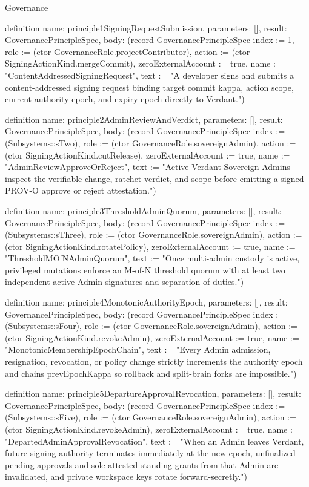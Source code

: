 \begin{lexlean}{Governance}
\begin{semanticmodule}
definition{
  name: principle1SigningRequestSubmission,
  parameters: [],
  result: GovernancePrincipleSpec,
  body: (record GovernancePrincipleSpec {index := 1, role := (ctor GovernanceRole.projectContributor), action := (ctor SigningActionKind.mergeCommit), zeroExternalAccount := true, name := "ContentAddressedSigningRequest", text := "A developer signs and submits a content-addressed signing request binding target commit kappa, action scope, current authority epoch, and expiry epoch directly to Verdant."})
}

definition{
  name: principle2AdminReviewAndVerdict,
  parameters: [],
  result: GovernancePrincipleSpec,
  body: (record GovernancePrincipleSpec {index := (Subsystems::sTwo), role := (ctor GovernanceRole.sovereignAdmin), action := (ctor SigningActionKind.cutRelease), zeroExternalAccount := true, name := "AdminReviewApproveOrReject", text := "Active Verdant Sovereign Admins inspect the verifiable change, ratchet verdict, and scope before emitting a signed PROV-O approve or reject attestation."})
}

definition{
  name: principle3ThresholdAdminQuorum,
  parameters: [],
  result: GovernancePrincipleSpec,
  body: (record GovernancePrincipleSpec {index := (Subsystems::sThree), role := (ctor GovernanceRole.sovereignAdmin), action := (ctor SigningActionKind.rotatePolicy), zeroExternalAccount := true, name := "ThresholdMOfNAdminQuorum", text := "Once multi-admin custody is active, privileged mutations enforce an M-of-N threshold quorum with at least two independent active Admin signatures and separation of duties."})
}

definition{
  name: principle4MonotonicAuthorityEpoch,
  parameters: [],
  result: GovernancePrincipleSpec,
  body: (record GovernancePrincipleSpec {index := (Subsystems::sFour), role := (ctor GovernanceRole.sovereignAdmin), action := (ctor SigningActionKind.revokeAdmin), zeroExternalAccount := true, name := "MonotonicMembershipEpochChain", text := "Every Admin admission, resignation, revocation, or policy change strictly increments the authority epoch and chains prevEpochKappa so rollback and split-brain forks are impossible."})
}

definition{
  name: principle5DepartureApprovalRevocation,
  parameters: [],
  result: GovernancePrincipleSpec,
  body: (record GovernancePrincipleSpec {index := (Subsystems::sFive), role := (ctor GovernanceRole.sovereignAdmin), action := (ctor SigningActionKind.revokeAdmin), zeroExternalAccount := true, name := "DepartedAdminApprovalRevocation", text := "When an Admin leaves Verdant, future signing authority terminates immediately at the new epoch, unfinalized pending approvals and sole-attested standing grants from that Admin are invalidated, and private workspace keys rotate forward-secretly."})
}


\end{semanticmodule}
\end{lexlean}
